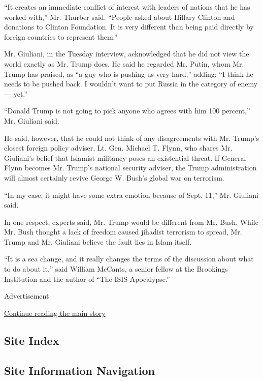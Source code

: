 ``It creates an immediate conflict of interest with leaders of nations
that he has worked with,'' Mr. Thurber said. ``People asked about
Hillary Clinton and donations to Clinton Foundation. It is very
different than being paid directly by foreign countries to represent
them.''

Mr. Giuliani, in the Tuesday interview, acknowledged that he did not
view the world exactly as Mr. Trump does. He said he regarded Mr. Putin,
whom Mr. Trump has praised, as ``a guy who is pushing us very hard,''
adding: ``I think he needs to be pushed back. I wouldn't want to put
Russia in the category of enemy --- yet.''

``Donald Trump is not going to pick anyone who agrees with him 100
percent,'' Mr. Giuliani said.

He said, however, that he could not think of any disagreements with Mr.
Trump's closest foreign policy adviser, Lt. Gen. Michael T. Flynn, who
shares Mr. Giuliani's belief that Islamist militancy poses an
existential threat. If General Flynn becomes Mr. Trump's national
security adviser, the Trump administration will almost certainly revive
George W. Bush's global war on terrorism.

``In my case, it might have some extra emotion because of Sept. 11,''
Mr. Giuliani said.

In one respect, experts said, Mr. Trump would be different from Mr.
Bush. While Mr. Bush thought a lack of freedom caused jihadist terrorism
to spread, Mr. Trump and Mr. Giuliani believe the fault lies in Islam
itself.

``It is a sea change, and it really changes the terms of the discussion
about what to do about it,'' said William McCants, a senior fellow at
the Brookings Institution and the author of ``The ISIS Apocalypse.''

Advertisement

\protect\hyperlink{after-bottom}{Continue reading the main story}

\hypertarget{site-index}{%
\subsection{Site Index}\label{site-index}}

\hypertarget{site-information-navigation}{%
\subsection{Site Information
Navigation}\label{site-information-navigation}}

